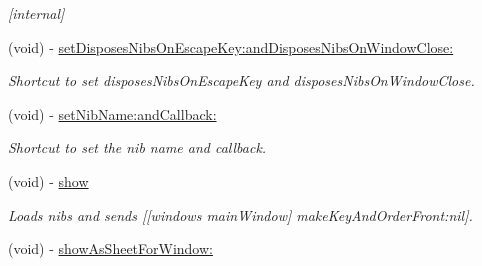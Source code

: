 \begin{DoxyCompactItemize}
\begin{DoxyCompactList}\small\item\em \mbox{[}internal\mbox{]} \item\end{DoxyCompactList}\item 
\hypertarget{interface_g_d_external_nib_controller_a37d6a495f93eb26b57e0bbc99c3ecda1}{
(void) -\/ \hyperlink{interface_g_d_external_nib_controller_a37d6a495f93eb26b57e0bbc99c3ecda1}{setDisposesNibsOnEscapeKey:andDisposesNibsOnWindowClose:}}
\label{interface_g_d_external_nib_controller_a37d6a495f93eb26b57e0bbc99c3ecda1}

\begin{DoxyCompactList}\small\item\em Shortcut to set disposesNibsOnEscapeKey and disposesNibsOnWindowClose. \item\end{DoxyCompactList}\item 
\hypertarget{interface_g_d_external_nib_controller_afa6bc7a0541ded35b2db361ba8ab6a7c}{
(void) -\/ \hyperlink{interface_g_d_external_nib_controller_afa6bc7a0541ded35b2db361ba8ab6a7c}{setNibName:andCallback:}}
\label{interface_g_d_external_nib_controller_afa6bc7a0541ded35b2db361ba8ab6a7c}

\begin{DoxyCompactList}\small\item\em Shortcut to set the nib name and callback. \item\end{DoxyCompactList}\item 
\hypertarget{interface_g_d_external_nib_controller_a077f73b3a74be990e38c58c7ecd78195}{
(void) -\/ \hyperlink{interface_g_d_external_nib_controller_a077f73b3a74be990e38c58c7ecd78195}{show}}
\label{interface_g_d_external_nib_controller_a077f73b3a74be990e38c58c7ecd78195}

\begin{DoxyCompactList}\small\item\em Loads nibs and sends \mbox{[}\mbox{[}windows mainWindow\mbox{]} makeKeyAndOrderFront:nil\mbox{]}. \item\end{DoxyCompactList}\item 
\hypertarget{interface_g_d_external_nib_controller_ad1a338656bde42271062169374736fe8}{
(void) -\/ \hyperlink{interface_g_d_external_nib_controller_ad1a338656bde42271062169374736fe8}{showAsSheetForWindow:}}
\label{interface_g_d_external_nib_controller_ad1a338656bde42271062169374736fe8}


\end{DoxyCompactItemize}
